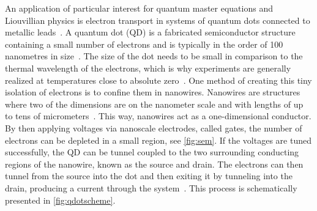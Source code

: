 \documentclass[../main.tex]{subfiles}
\begin{document}
An application of particular interest for quantum master equations and Liouvillian physics is electron transport in systems of quantum dots connected to metallic leads~\cite{qdottrans}. A quantum dot (QD) is a fabricated semiconductor structure containing a small number of electrons and is typically in the order of 100 nanometres in size~\cite{qdotmarcus}. The size of the dot needs to be small in comparison to the thermal wavelength of the electrons, which is why experiments are generally realized at temperatures close to absolute zero~\cite{etrans}. One method of creating this tiny isolation of electrons is to confine them in nanowires. Nanowires are structures where two of the dimensions are on the nanometer scale and with lengths of up to tens of micrometers~\cite{sven}. This way, nanowires act as a one-dimensional conductor. By then applying voltages via nanoscale electrodes, called gates, the number of electrons can be depleted in a small region, see \cref{fig:sem}. If the voltages are tuned successfully, the QD can be tunnel coupled to the two surrounding conducting regions of the nanowire, known as the source and drain. The electrons can then tunnel from the source into the dot and then exiting it by tunneling into the drain, producing a current through the system~\cite{qdotmarcus}. This process is schematically presented in \cref{fig:qdotscheme}.
\end{document}
